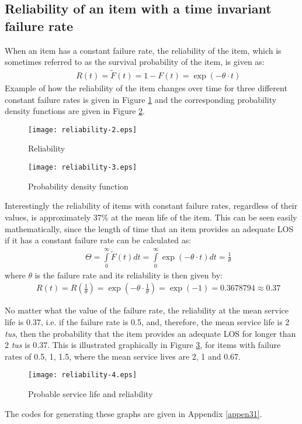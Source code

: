 \subsection{Reliability of an item with a time invariant failure rate}
When an item has a constant failure rate, the reliability of the item, which is
sometimes referred to as the survival probability of the item, is given as:
\begin{eqnarray}
&& R(t) = \tilde F(t) = 1 - F(t) = \exp ( - \theta  \cdot t)
\label{eqreliability:7}
\end{eqnarray}
Example of how the reliability of the item changes over time for three different
constant failure rates is given in Figure \ref{reliability-2} and the corresponding
probability density functions are given in Figure \ref{reliability-3}.
%
\begin{figure}[h]
\texttt{[image: reliability-2.eps]}
\caption{Reliability}\label{reliability-2}
\end{figure}
\begin{figure}[h]
\texttt{[image: reliability-3.eps]}
\caption{Probability density function}\label{reliability-3}
\end{figure}
Interestingly the reliability of items with constant failure rates, regardless
of their values, is approximately 37\% at the mean life of the item. This can be
seen easily mathematically, since the length of time that an item provides an
adequate LOS if it has a constant failure rate can be calculated as:
\begin{eqnarray}
&& \Theta  = \int\limits_0^\infty  {\tilde F(t)dt}  = \int\limits_0^\infty  {\exp (
- \theta  \cdot t)dt}  = \frac{1}{\theta } \label{eqreliability:8}
\end{eqnarray}
where $\theta $ is the failure rate and its reliability is then given by:
\begin{eqnarray}
&& R(t) = R(\frac{1}{\theta }) = \exp ( - \theta  \cdot \frac{1}{\theta }) = \exp (
- 1) = 0.3678794 \approx 0.37
\label{eqreliability:9}
\end{eqnarray}

No matter what the value of the failure rate, the reliability at the mean
service life is 0.37, i.e. if the failure rate is 0.5, and, therefore, the mean
service life is 2 \textit{tus}, then the probability that the item provides an
adequate LOS for longer than 2 \textit{tus} is 0.37. This is illustrated
graphically in Figure \ref{reliability-4}, for items with failure rates of 0.5, 1, 1.5,
where the mean service lives are 2, 1 and 0.67.
%
\begin{figure}[h]
\texttt{[image: reliability-4.eps]}
\caption{Probable service life and reliability}\label{reliability-4}
\end{figure}
The codes for generating these graphs are given in Appendix \ref{appen31}.
